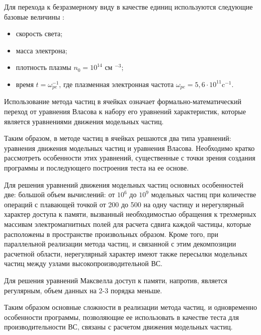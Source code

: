 Для перехода к безразмерному виду в качестве единиц
используются следующие базовые величины \cite{VychMetPlasma}:
\begin{itemize}
	\item скорость света;
	\item масса электрона;
	\item плотность плазмы $n_0=10^{14}$ см $^{-3}$;
	\item время $t=\omega _{pe}^{-1}$, где плазменная электронная частота $\omega_{pe} =5,6 \cdot 10^{11}$c$^{-1}$.
\end{itemize}

Использование метода частиц в ячейках означает формально-математический переход от уравнения Власова к набору его уравнений характеристик, которые является уравнениями движения модельных частиц.

Таким образом, в методе частиц в ячейках решаются два типа уравнений: уравнения движения модельных частиц и уравнения Власова. Необходимо кратко рассмотреть особенности этих уравнений, существенные с точки зрения создания программы и последующего построения теста на ее основе.

Для решения уравнений движения модельных частиц основных особенностей две: большой объем вычислений: от $10^6$ до $10^9$
модельных частиц при количестве операций с плавающей точкой от 200 до 500 на одну частицу и нерегулярный характер доступа к памяти, вызванный необходимостью обращения к трехмерных массивам электромагнитных полей для расчета сдвига каждой частицы, которые расположены в пространстве произвольных образом. Кроме того, при параллельной реализации метода частиц, и связанной с этим декомпозиции расчетной области, нерегулярный характер имеют также пересылки модельных частиц между узлами высокопроизводительной ВС.

Для решения уравнений Максвелла доступ к памяти, напротив, является регулярным, объем данных на 2-3 порядка меньше. 


Таким образом основные сложности в реализации метода частиц, и одновременно особенности программы, позволяющие ее использовать в качестве теста для производительности ВС, связаны с расчетом движения модельных частиц.%

